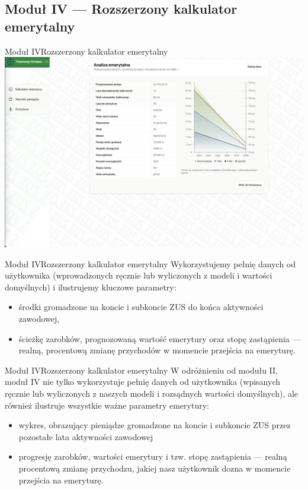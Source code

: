 \subsection{Moduł IV --- Rozszerzony kalkulator emerytalny}

\begin{frame}[t]{Moduł IV}{Rozszerzony kalkulator emerytalny}
  \includegraphics[width=.8\textwidth]{img/module_4_extended_pension_calculator}
\end{frame}

\begin{frame}[t]{Moduł IV}{Rozszerzony kalkulator emerytalny}
Wykorzystujemy pełnię danych od użytkownika (wprowadzonych ręcznie lub wyliczonych z modeli i wartości domyślnych)
i ilustrujemy kluczowe parametry:
\begin{itemize}
  \pause
  \item środki gromadzone na koncie i subkoncie ZUS do końca aktywności zawodowej,
  \pause
  \item ścieżkę zarobków, prognozowaną wartość emerytury oraz stopę zastąpienia ---
        realną, procentową zmianę przychodów w momencie przejścia na emeryturę.
\end{itemize}
\end{frame}

\begin{frame}[t]{Moduł IV}{Rozszerzony kalkulator emerytalny}
W odróżnieniu od modułu II, moduł IV nie tylko wykorzystuje pełnię danych od użytkownika
(wpisanych ręcznie lub wyliczonych z naszych modeli i rozsądnych wartości domyślnych),
ale również ilustruje wszystkie ważne parametry emerytury:

\begin{itemize}
    \pause
    \item wykres, obrazujący pieniądze gromadzone na koncie i subkoncie ZUS przez pozostałe lata aktywności
    zawodowej
    \pause
    \item progresję zarobków, wartości emerytury i tzw. stopę zastąpienia --- realną procentową zmianę
    przychodzu, jakiej nasz użytkownik dozna w momencie przejścia na emeryturę.
\end{itemize}
\end{frame}

